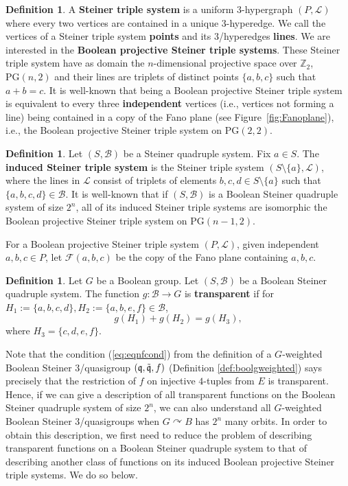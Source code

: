 \documentclass{article}
\theoremstyle{remark}
\theoremstyle{definition}
\newtheorem{definition}[theorem]{Definition}
\def\acts{\curvearrowright}
\begin{document}
\begin{definition} A \textbf{Steiner triple system} is a uniform $3$-hypergraph $(P, \mathcal{L})$ where every two vertices are contained in a unique $3$-hyperedge. We call the vertices of a Steiner triple system \textbf{points} and its $3$\-/hyperedges \textbf{lines}. We are interested in the \textbf{Boolean projective Steiner triple systems}. These Steiner triple system have as domain the $n$-dimensional projective space over $\mathbb{Z}_2$, $\mathrm{PG}(n, 2)$ and their lines are triplets of distinct points $\{a,b,c\}$ such that $a+b=c$. It is well-known that being a Boolean projective Steiner triple system is equivalent to every three \textbf{independent} vertices (i.e., vertices not forming a line) being contained in a copy of the Fano plane (see Figure~\ref{fig:Fanoplane}), i.e., the Boolean projective Steiner triple system on $\mathrm{PG}(2, 2)$. 
\end{definition}

\begin{definition} Let $(S, \mathcal{B})$ be a Steiner quadruple system. Fix $a\in S$. The \textbf{induced Steiner triple system} is the Steiner triple system $(S\setminus\{a\}, \mathcal{L})$, where the lines in $\mathcal{\mathcal{L}}$ consist of triplets of elements $b,c,d\in S\setminus\{a\}$ such that $\{a,b,c,d\}\in\mathcal{B}$. It is well-known that if $(S, \mathcal{B})$ is a Boolean Steiner quadruple system of size $2^n$, all of its induced Steiner triple systems are isomorphic the Boolean projective Steiner triple system on $\mathrm{PG}(n-1, 2)$.
\end{definition}

For a Boolean projective Steiner triple system $(P, \mathcal{L})$, given independent $a,b,c\in P$, let $\mathcal{F}(a,b,c)$ be the copy of the Fano plane containing $a,b,c$. 

\begin{definition} Let $G$ be a Boolean group. Let $(S, \mathcal{B})$ be a Boolean Steiner quadruple system. The function $g:\mathcal{B}\to G$ is \textbf{transparent} if for $H_1:=\{a,b,c,d\}, H_2:=\{a,b,e,f\}\in\mathcal{B}$, 
\begin{equation}\label{eq:transp}
   g(H_1)+g(H_2)=g(H_3), 
\end{equation}
where $H_3=\{c,d,e,f\}$. 
\end{definition}


Note that the condition (\ref{eq:eqnfcond}) from the definition of a $G$-weighted Boolean Steiner $3$\-/quasigroup $(\mathfrak{q}, \Tilde{\mathfrak{q}}, f)$ (Definition \ref{def:boolgweighted}) says precisely that the restriction of $f$ on injective $4$-tuples from $E$ is transparent. Hence, if we can give a description of all transparent functions on the Boolean Steiner quadruple system of size $2^n$, we can also understand all $G$-weighted Boolean Steiner $3$\-/quasigroups when $G\acts B$ has $2^n$ many orbits. In order to obtain this description, we first need to reduce the problem of describing transparent functions on a Boolean Steiner quadruple system to that of describing another class of functions on its induced Boolean projective Steiner triple systems. We do so below.
\end{document}
